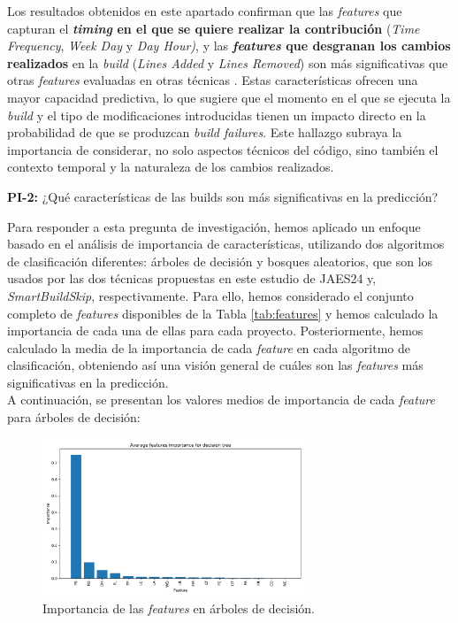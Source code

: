 Los resultados obtenidos en este apartado confirman que las \textit{features} que capturan el
\textbf{\textit{timing} en el que se quiere realizar la contribución} (\textit{Time Frequency},
\textit{Week Day} y \textit{Day Hour)}, y las \textbf{\textit{features} que desgranan los cambios
realizados} en la \textit{build} (\textit{Lines Added} y \textit{Lines Removed}) son más
significativas que otras \textit{features} evaluadas en otras técnicas \cite{2}. Estas
características ofrecen una mayor capacidad predictiva, lo que sugiere que el momento en el que
se ejecuta la \textit{build} y el tipo de modificaciones introducidas tienen un impacto directo
en la probabilidad de que se produzcan \textit{build failures}. Este hallazgo subraya la
importancia de considerar, no solo aspectos técnicos del código, sino también el contexto temporal
y la naturaleza de los cambios realizados.\\

\begin{mdframed}[backgroundcolor=gray!10,linewidth=0.5pt,roundcorner=1pt]
    \textbf{PI-2:} ¿Qué características de las builds son más significativas en la predicción?
\end{mdframed}

Para responder a esta pregunta de investigación, hemos aplicado un enfoque basado en el análisis
de importancia de características, utilizando dos algoritmos de clasificación diferentes:
árboles de decisión y bosques aleatorios, que son los usados por las dos técnicas propuestas en
este estudio de JAES24 y, \textit{SmartBuildSkip}, respectivamente. Para ello, hemos
considerado el conjunto completo de \textit{features} disponibles de la Tabla \ref{tab:features}
y hemos calculado la importancia de cada una de ellas para cada proyecto. Posteriormente, hemos
calculado la media de la importancia de cada \textit{feature} en cada algoritmo de clasificación,
obteniendo así una visión general de cuáles son las \textit{features} más significativas en la
predicción.\\

\noindent A continuación, se presentan los valores medios de importancia de cada \textit{feature}
para árboles de decisión:

\begin{figure}[H]
    \centering
    \includegraphics[width=0.7\textwidth]{images/Average features importance for decision tree.pdf}
    \caption{Importancia de las \textit{features} en árboles de decisión.}
    \label{fig:decision_tree_feature_importance}
\end{figure}

